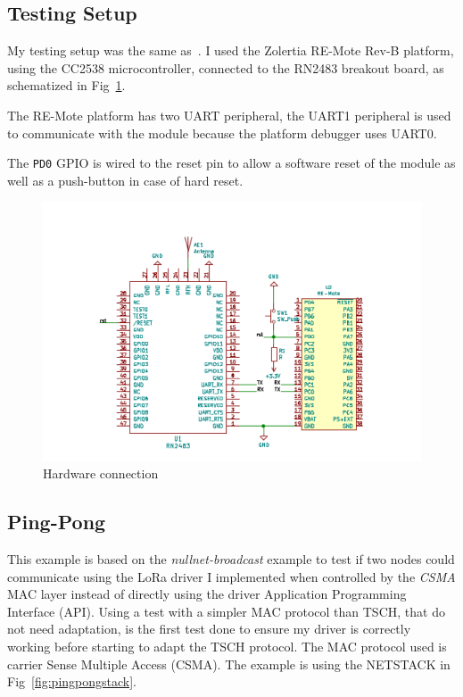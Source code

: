 \subsection{Testing Setup}

My testing setup was the same as~\cite{8847137}. I used the Zolertia RE-Mote
Rev-B platform, using the CC2538 microcontroller, connected to the
RN2483 breakout board, as schematized in Fig~\ref{fig:schemaconn}.

The RE-Mote platform has two UART peripheral, the UART1 peripheral is used
to communicate with the module because the platform debugger uses UART0.

The \lstinline{PD0} GPIO is wired to the reset pin to allow
a software reset of the module as well as a push-button in case of hard reset.

\begin{figure}[H]
  \centering
  \includegraphics[scale=0.70]{thesis.tex/chapters/driver/fig/conn_diag.pdf}
  \caption{Hardware connection\label{fig:schemaconn}}
\end{figure}

\subsection{Ping-Pong\label{section:pingpong}}

This example is based on the \emph{nullnet-broadcast} example to test if two
nodes could communicate using the LoRa driver I implemented when controlled by
the \emph{CSMA} MAC layer instead of directly using the driver Application Programming Interface (API)\@.
Using a test with a simpler MAC protocol than TSCH, that do not need adaptation,
is the first test done to ensure my driver is correctly working before starting to adapt
the TSCH protocol.
The MAC protocol used is carrier Sense Multiple Access (CSMA).
The example is using the NETSTACK in Fig~\ref{fig:pingpongstack}.


